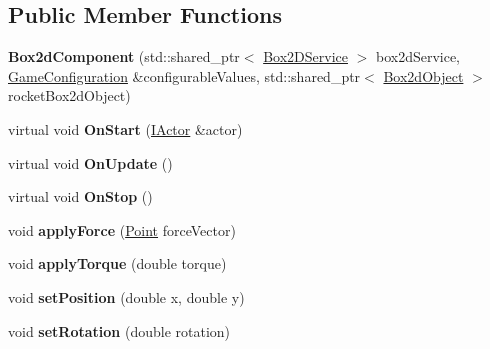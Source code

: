 \subsection*{Public Member Functions}
\begin{DoxyCompactItemize}
\item 
{\bfseries Box2d\+Component} (std\+::shared\+\_\+ptr$<$ \hyperlink{classBox2DService}{Box2\+D\+Service} $>$ box2d\+Service, \hyperlink{classGameConfiguration}{Game\+Configuration} \&configurable\+Values, std\+::shared\+\_\+ptr$<$ \hyperlink{classBox2dObject}{Box2d\+Object} $>$ rocket\+Box2d\+Object)\hypertarget{classBox2dComponent_a7287159031753cbfeb253cffe220c46c}{}\label{classBox2dComponent_a7287159031753cbfeb253cffe220c46c}

\item 
virtual void {\bfseries On\+Start} (\hyperlink{classIActor}{I\+Actor} \&actor)\hypertarget{classBox2dComponent_a4ffa4328e50443a258226cbd5c92fec3}{}\label{classBox2dComponent_a4ffa4328e50443a258226cbd5c92fec3}

\item 
virtual void {\bfseries On\+Update} ()\hypertarget{classBox2dComponent_a24767c8d67bec9e557038330bb136958}{}\label{classBox2dComponent_a24767c8d67bec9e557038330bb136958}

\item 
virtual void {\bfseries On\+Stop} ()\hypertarget{classBox2dComponent_ae91ad9fd1ac4a0950b01e7ab12bf6d7e}{}\label{classBox2dComponent_ae91ad9fd1ac4a0950b01e7ab12bf6d7e}

\item 
void {\bfseries apply\+Force} (\hyperlink{classPoint}{Point} force\+Vector)\hypertarget{classBox2dComponent_a3180efda44919c4f37aa83e93b96a036}{}\label{classBox2dComponent_a3180efda44919c4f37aa83e93b96a036}

\item 
void {\bfseries apply\+Torque} (double torque)\hypertarget{classBox2dComponent_af32c4ae582ce53333352cea32cf316ba}{}\label{classBox2dComponent_af32c4ae582ce53333352cea32cf316ba}

\item 
void {\bfseries set\+Position} (double x, double y)\hypertarget{classBox2dComponent_a51a6d470f67f542e05403c1e7f9bb76f}{}\label{classBox2dComponent_a51a6d470f67f542e05403c1e7f9bb76f}

\item 
void {\bfseries set\+Rotation} (double rotation)\hypertarget{classBox2dComponent_a2ff4ab8dc5eed26824ae13e3e305b414}{}\label{classBox2dComponent_a2ff4ab8dc5eed26824ae13e3e305b414}


\end{DoxyCompactItemize}
